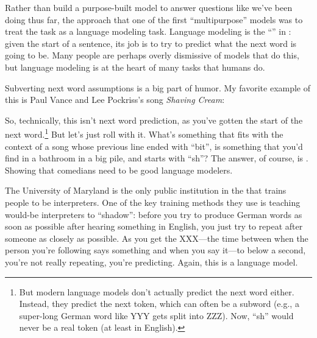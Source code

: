 Rather than build a purpose-built model to answer questions like we've been doing thus far, the approach that one of the first ``multipurpose'' models was to treat the task as a language modeling task.
%
Language modeling is the ``'' in : given the start of a sentence, its job is to try to predict what the next word is going to be.
%
Many people are perhaps overly dismissive of models that do this, but language modeling is at the heart of many tasks that humans do.

Subverting next word assumptions is a big part of humor.  My favorite example of this is Paul Vance and Lee Pockriss's song \textit{Shaving Cream}:%
\begin{quote}
	
\end{quote}
So, technically, this isn't next word prediction, as you've gotten the start of the next word.\footnote{But modern language models don't actually predict the next word either.  Instead, they predict the next token, which can often be a subword (e.g., a super-long German word like YYY gets split into ZZZ).  Now, ``sh'' would never be a real token (at least in English).}
%
But let's just roll with it.  What's something that fits with the context of a song whose previous line ended with ``bit'', is something that you'd find in a bathroom in a big pile, and starts with ``sh''?
%
The answer, of course, is .
%
Showing that comedians need to be good language modelers.

The University of Maryland is the only public institution in the  that trains people to be interpreters.
%
One of the key training methods they use is teaching would-be interpreters to ``shadow'': before you try to produce German words as soon as possible after hearing something in English, you just try to repeat after someone as closely as possible.  
%
As you get the XXX---the time between when the person you're following says something and when you say it---to below a second, you're not really repeating, you're predicting.
%
Again, this is a language model.

